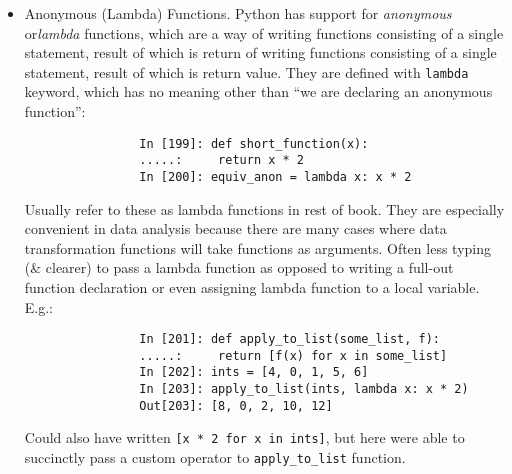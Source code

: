 \documentclass{article}
\begin{document}
\begin{itemize}
\begin{itemize}
\begin{itemize}
\begin{verbatim}
				clean_ops = [str.strip, remove_punctuation, str.title]
				
				def clean_strings(strings, ops):
				result = []
				for value in strings:
				for func in ops:
				value = func(value)
				result.append(value)
				return result
			\end{verbatim}
			Then have following:
			\begin{verbatim}
				In [197]: clean_strings(states, clean_ops)
				Out[197]:
				['Alabama',
				'Georgia',
				'Georgia',
				'Georgia',
				'Florida',
				'South   Carolina',
				'West Virginia']
			\end{verbatim}
			A more {\it functional} pattern like this enables you to easily modify how strings are transformed at a very high level. \verb|clean_strings| function is also now more reusable \& generic.
			
			Can use functions as arguments to other functions like built-in {\tt map} function, which applies a function to a sequence of some kind:
			\begin{verbatim}
				In [198]: for x in map(remove_punctuation, states):
				.....:     print(x)
				Alabama
				Georgia
				Georgia
				georgia
				FlOrIda
				south   carolina
				West virginia
			\end{verbatim}
			{\tt map} can be used as an alternative to list comprehensions without any filter.
			\item {\sf Anonymous (Lambda) Functions.} Python has support for {\it anonymous} or{\it lambda} functions, which are a way of writing functions consisting of a single statement, result of which is return of writing functions consisting of a single statement, result of which is return value. They are defined with {\tt lambda} keyword, which has no meaning other than ``we are declaring an anonymous function'':
			\begin{verbatim}
				In [199]: def short_function(x):
				.....:     return x * 2
				In [200]: equiv_anon = lambda x: x * 2
			\end{verbatim}
			Usually refer to these as lambda functions in rest of book. They are especially convenient in data analysis because there are many cases where data transformation functions will take functions as arguments. Often less typing (\& clearer) to pass a lambda function as opposed to writing a full-out function declaration or even assigning lambda function to a local variable. E.g.:
			\begin{verbatim}
				In [201]: def apply_to_list(some_list, f):
				.....:     return [f(x) for x in some_list]
				In [202]: ints = [4, 0, 1, 5, 6]
				In [203]: apply_to_list(ints, lambda x: x * 2)
				Out[203]: [8, 0, 2, 10, 12]
			\end{verbatim}
			Could also have written {\tt [x * 2 for x in ints]}, but here were able to succinctly pass a custom operator to \verb|apply_to_list| function.
			

\end{itemize}
\end{itemize}
\end{itemize}
\end{document}
